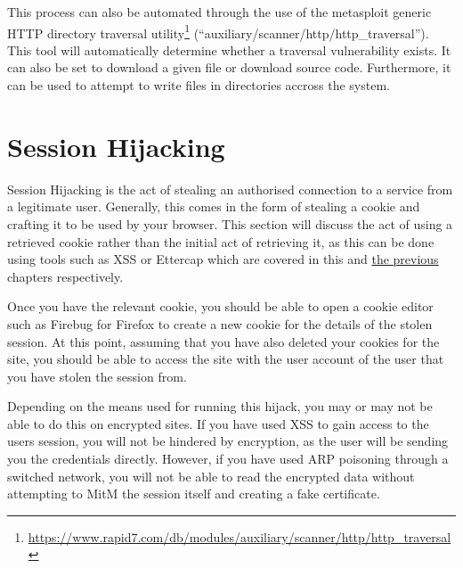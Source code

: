 		This process can also be automated through the use of the metasploit generic HTTP directory traversal
		utility\footnote{\url{https://www.rapid7.com/db/modules/auxiliary/scanner/http/http_traversal}}
		(``auxiliary/scanner/http/http\_traversal'').
		This tool will automatically determine whether a traversal vulnerability exists.
		It can also be set to download a given file or download source code.
		Furthermore, it can be used to attempt to write files in directories accross the system.
	\section{Session Hijacking}
		Session Hijacking is the act of stealing an authorised connection to a service from a legitimate user.
		Generally, this comes in the form of stealing a cookie and crafting it to be used by your browser.
		This section will discuss the act of using a retrieved cookie rather than the initial act of retrieving it,
		as this can be done using tools such as XSS or Ettercap which are covered in this and \href{ch:NetworkPenetration}{the previous} chapters respectively.

		Once you have the relevant cookie, you should be able to open a cookie editor such as Firebug for Firefox to create a new cookie for the details of the stolen session.
		At this point, assuming that you have also deleted your cookies for the site, you should be able to access the site with the user account of the user that you have stolen the session from.

		Depending on the means used for running this hijack, you may or may not be able to do this on encrypted sites.
		If you have used XSS to gain access to the users session, you will not be hindered by encryption, as the user will be sending you the credentials directly.
		However, if you have used ARP poisoning through a switched network, you will not be able to read the encrypted data without attempting to MitM the session itself and creating a fake certificate.
